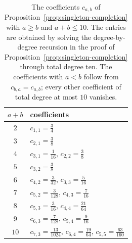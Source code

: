 \begin{table}[t]
\centering
\caption{The coefficients $c_{a,b}$ of
Proposition~\ref{prop:singleton-completion} with $a\geq b$ and $a+b\leq10$.
The entries are obtained by solving the degree-by-degree recursion in the
proof of Proposition~\ref{prop:singleton-completion} through total degree
ten.  The coefficients with $a<b$ follow
from $c_{b,a}=c_{a,b}$; every other coefficient of total degree at most $10$
vanishes.}
\label{tab:singleton-coefficients}
\renewcommand{\arraystretch}{1.25}
\begin{tabular}{cl}
\toprule
$a+b$ & coefficients\\
\midrule
$2$ & $c_{1,1}=\frac34$\\
$3$ & $c_{2,1}=\frac38$\\
$4$ & $c_{3,1}=\frac1{16}$, $c_{2,2}=\frac38$\\
$5$ & $c_{3,2}=\frac38$\\
$6$ & $c_{4,2}=\frac3{32}$, $c_{3,3}=\frac5{16}$\\
$7$ & $c_{5,2}=\frac3{128}$, $c_{4,3}=\frac7{16}$\\
$8$ & $c_{5,3}=\frac3{16}$, $c_{4,4}=\frac{21}{64}$\\
$9$ & $c_{6,3}=\frac7{128}$, $c_{5,4}=\frac9{16}$\\
$10$ & $c_{7,3}=\frac{13}{1024}$, $c_{6,4}=\frac{19}{64}$, $c_{5,5}=\frac{63}{160}$\\
\bottomrule
\end{tabular}
\end{table}

